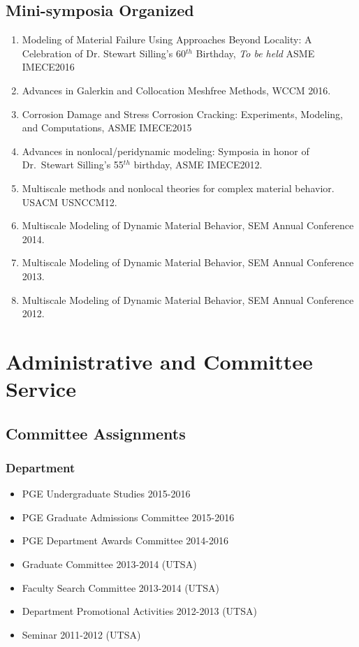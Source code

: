 \subsection*{Mini-symposia Organized}

\begin{enumerate}
    \item Modeling of Material Failure Using Approaches Beyond Locality: A Celebration of Dr. Stewart Silling's 60$^{th}$ Birthday, \emph{To be held} ASME IMECE2016
    \item Advances in Galerkin and Collocation Meshfree Methods, WCCM 2016.
    \item Corrosion Damage and Stress Corrosion Cracking: Experiments, Modeling, and Computations, ASME IMECE2015
    \item Advances in nonlocal/peridynamic modeling: Symposia in honor of Dr.~Stewart Silling's 55$^{th}$ birthday, ASME IMECE2012.
    \item Multiscale methods and nonlocal theories for complex material behavior. USACM USNCCM12.
    \item Multiscale Modeling of Dynamic Material Behavior, SEM Annual Conference 2014.
    \item Multiscale Modeling of Dynamic Material Behavior, SEM Annual Conference 2013.
    \item Multiscale Modeling of Dynamic Material Behavior, SEM Annual Conference 2012.
\end{enumerate}

\section*{Administrative and Committee Service}
\subsection*{Committee Assignments}
\subsubsection*{Department}
\begin{itemize}
    \item PGE Undergraduate Studies 2015-2016
    \item PGE Graduate Admissions Committee 2015-2016
    \item PGE Department Awards Committee 2014-2016
    \item Graduate Committee 2013-2014 (UTSA)
    \item Faculty Search Committee 2013-2014 (UTSA)
    \item Department Promotional Activities 2012-2013 (UTSA)
    \item Seminar 2011-2012 (UTSA)
\end{itemize}

